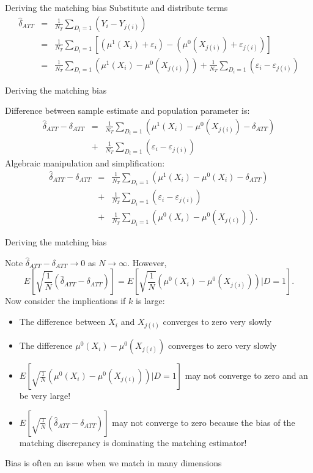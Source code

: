\documentclass{beamer}
\begin{document}
\begin{frame}{Deriving the matching bias}
  Substitute and distribute terms
  \begin{eqnarray*}
    \widehat{\delta}_{ATT} &=& \frac{1}{N_T} \sum_{D_i=1} (Y_i - Y_{j(i)}) \\
    &=& \frac{1}{N_T} \sum_{D_i=1} \left[ (\mu^1(X_i) + \varepsilon_i) - (\mu^0(X_{j(i)}) + \varepsilon_{j(i)}) \right] \\
    &=&  \frac{1}{N_T} \sum_{D_i=1} (\mu^1(X_i) - \mu^0(X_{j(i)})) + \frac{1}{N_T} \sum_{D_i=1}(\varepsilon_i - \varepsilon_{j(i)})
  \end{eqnarray*}
\end{frame}
		

\begin{frame}{Deriving the matching bias}
	
Difference between sample estimate and population parameter is:
		\begin{eqnarray*}
		\widehat{\delta}_{ATT} - \delta_{ATT} &=& \frac{1}{N_T} \sum_{D_i=1} \left( \mu^1(X_i) - \mu^0(X_{j(i)}) - \delta_{ATT}\right) \\
		&+& \frac{1}{N_T} \sum_{D_i=1} (\varepsilon_i - \varepsilon_{j(i)})
		\end{eqnarray*}
Algebraic manipulation and simplification:
		\begin{eqnarray*}
		\widehat{\delta}_{ATT} - \delta_{ATT} &=& \frac{1}{N_T} \sum_{D_i=1} \left( \mu^1(X_i) - \mu^0(X_i) - \delta_{ATT}\right) \\
		&+& \frac{1}{N_T} \sum_{D_i=1} (\varepsilon_i - \varepsilon_{j(i)}) \\
		&+& \frac{1}{N_T} \sum_{D_i=1} \left( \mu^0(X_i) - \mu^0(X_{j(i)}) \right).
		\end{eqnarray*}
\end{frame}


\begin{frame}{Deriving the matching bias}
	
Note $\widehat{\delta}_{ATT} - \delta_{ATT} \to 0$ as $N \to \infty$.
\pause However, 
$$E[ \sqrt{\frac{1}{N}} (\widehat{\delta}_{ATT} - \delta_{ATT})] = E[ \sqrt{\frac{1}{N}} ( \mu^0(X_i) - \mu^0(X_{j(i)}) ) | D=1].$$ 
\pause
Now consider the implications if $k$ is large:
\pause	\begin{itemize}
	\item The difference between $X_i$ and $X_{j(i)}$ converges to zero very slowly 
\pause	\item The difference $\mu^0(X_i) - \mu^0(X_{j(i)})$ converges to zero very slowly \pause
	\item $E[ \sqrt{\frac{1}{N}} (\mu^0(X_i) - \mu^0(X_{j(i)})) | D=1]$ may not converge to zero and an be very large! 
\pause	\item $E[ \sqrt{\frac{1}{N}} (\widehat{\delta}_{ATT} - \delta_{ATT})]$ may not converge to zero because the bias of the matching discrepancy is dominating the matching estimator! \pause
	\end{itemize}
 Bias is often an issue when we match in many dimensions
\end{frame}
\end{document}
